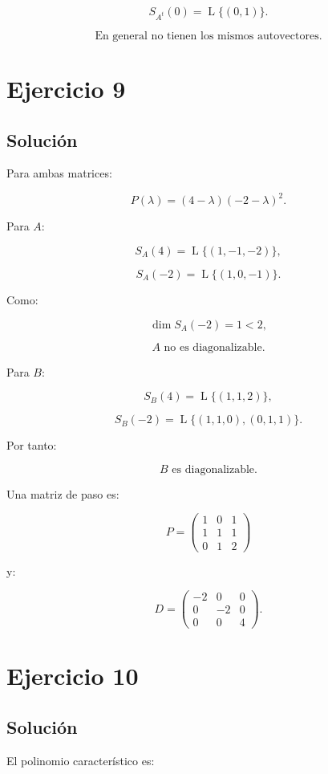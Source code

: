 \documentclass[11pt,a4paper]{article}
\newcommand{\Span}{\operatorname{L}}
\begin{document}
\[
S_{A^t}(0)=\Span\{(0,1)\}.
\]

\[
\boxed{
\text{En general no tienen los mismos autovectores.}
}
\]

\section{Ejercicio 9}
\subsection{Solución}

Para ambas matrices:

\[
P(\lambda)
=
(4-\lambda)(-2-\lambda)^2.
\]

Para $A$:

\[
S_A(4)=\Span\{(1,-1,-2)\},
\]

\[
S_A(-2)=\Span\{(1,0,-1)\}.
\]

Como:

\[
\dim S_A(-2)=1<2,
\]

\[
\boxed{
A\text{ no es diagonalizable.}
}
\]

Para $B$:

\[
S_B(4)=\Span\{(1,1,2)\},
\]

\[
S_B(-2)
=
\Span\{(1,1,0),(0,1,1)\}.
\]

Por tanto:

\[
\boxed{
B\text{ es diagonalizable.}
}
\]

Una matriz de paso es:

\[
\boxed{
P=
\begin{pmatrix}
1&0&1\\
1&1&1\\
0&1&2
\end{pmatrix}
}
\]

y:

\[
\boxed{
D=
\begin{pmatrix}
-2&0&0\\
0&-2&0\\
0&0&4
\end{pmatrix}.
}
\]

\section{Ejercicio 10}
\subsection{Solución}

El polinomio característico es:
\end{document}
